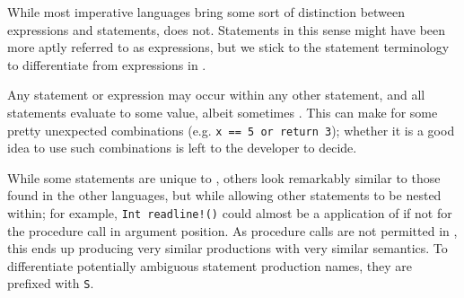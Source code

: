 While most imperative languages bring some sort of distinction between
expressions and statements, \Prose{} does not. Statements in this
sense might have been more aptly referred to as expressions, but we
stick to the statement terminology to differentiate from expressions
in \Poetry{}.

Any statement or expression may occur within any other statement, and
all statements evaluate to some value, albeit sometimes .
This can make for some pretty unexpected combinations
(e.g. \texttt{x == 5 or return 3}); whether it is a good idea to use
such combinations is left to the developer to decide.

While some statements are unique to \Prose{}, others look remarkably similar
to those found in the other languages, but while allowing other statements
to be nested within; for example, \texttt{Int readline!()} could almost be
a \Poetry{} application of  if not for the procedure call in argument
position. As procedure calls are not permitted in \Poetry{}, this ends up
producing very similar productions with very similar semantics. To
differentiate potentially ambiguous statement production names, they
are prefixed with \texttt{S}.

\begin{bnf*}
     \\
     \\
     \\
     \\
     \\
     \\
     \\
     \\
     \\
     \\
\end{bnf*}

